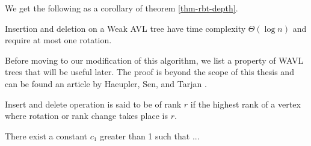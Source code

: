 






We get the following as a corollary of theorem \ref{thm-rbt-depth}.

\begin{prop}
Insertion and deletion on a Weak AVL tree have time complexity $\Theta(\log n)$ and require at most one rotation.
\end{prop}

Before moving to our modification of this algorithm, we list a property of WAVL trees that will be useful later. The proof is beyond the scope of this thesis and can be found an article by Haeupler, Sen, and Tarjan \cite{rank-balanced-trees}.

\begin{defn}
Insert and delete operation is said to be of rank $r$ if the highest rank of a vertex where rotation or rank change takes place is $r$.
\end{defn}

\begin{prop}
There exist a constant $c_1$ greater than 1 such that ... %
\end{prop}